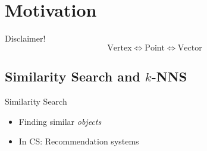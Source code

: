 \section{Motivation}

\begin{frame}{Disclaimer!}
    \[
        \text{Vertex} \iff \text{Point} \iff \text{Vector}
    \]
\end{frame}

\subsection{Similarity Search and \(k\)-NNS}

\begin{frame}{Similarity Search}
    \begin{itemize}
        \item Finding similar \textit{objects}
        \item In CS: Recommendation systems
    \end{itemize}
\end{frame}


